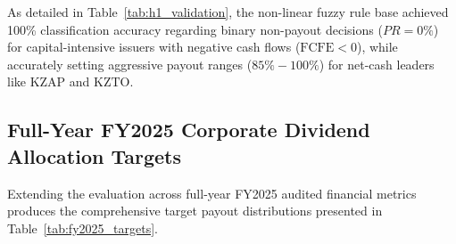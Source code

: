 \documentclass[pdflatex,sn-mathphys-num]{sn-jnl}
\theoremstyle{thmstyleone}
\theoremstyle{thmstyletwo}
\theoremstyle{thmstylethree}
\begin{document}
\begin{table}[h!]
\centering
\caption{Validation of TSK Model Payout Ratio Recommendations vs. Actual Corporate Decisions (H1 2025)}
\label{tab:h1_validation}
\end{table}

As detailed in Table~\ref{tab:h1_validation}, the non-linear fuzzy rule base achieved 100\% classification accuracy regarding binary non-payout decisions ($PR = 0\%$) for capital-intensive issuers with negative cash flows ($\text{FCFE} < 0$), while accurately setting aggressive payout ranges ($85\% - 100\%$) for net-cash leaders like $\text{KZAP}$ and $\text{KZTO}$.

\subsection{Full-Year FY2025 Corporate Dividend Allocation Targets}

Extending the evaluation across full-year FY2025 audited financial metrics produces the comprehensive target payout distributions presented in Table~\ref{tab:fy2025_targets}.
\end{document}
